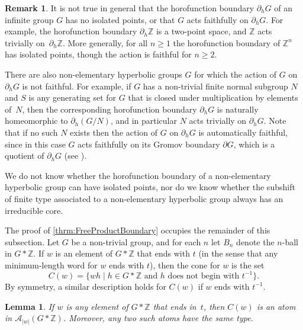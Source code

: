 \documentclass[11pt,letterpaper]{amsart}
\newtheorem{lemma}[theorem]{Lemma}
\theoremstyle{definition}
\newtheorem{remark}[theorem]{Remark}
\newcommand{\Z}{\mathbb{Z}}
\newcommand{\A}{\mathcal{A}}
\begin{document}
\begin{remark}\label{rmk:horofunction_problems}
It is not true in general that the horofunction boundary $\partial_h G$ of an infinite group $G$ has no isolated points, or that $G$ acts faithfully on $\partial_h G$.  For example, the horofunction boundary $\partial_h \Z$ is a two-point space, and $\Z$ acts trivially on~$\partial_h\Z$.  More generally, for all $n\ge 1$ the horofunction boundary of $\Z^n$ has isolated points, though the action is faithful for $n\geq 2$.

There are also non-elementary hyperbolic groups $G$ for which the action of $G$ on $\partial_h G$ is not faithful.  For example, if $G$ has a non-trivial finite normal subgroup $N$ and $S$ is any generating set for $G$ that is closed under multiplication by elements of~$N$, then the corresponding horofunction boundary $\partial_h G$ is naturally homeomorphic to $\partial_h(G/N)$, and in particular $N$ acts trivially on $\partial_h G$.  Note that if no such $N$ exists then the action of $G$ on $\partial_h G$ is automatically faithful, since in this case $G$ acts faithfully on its Gromov boundary $\partial G$, which is a quotient of $\partial_h G$ (see \cite{WeWi}).

We do not know whether the horofunction boundary of a non-elementary hyperbolic group can have isolated points, nor do we know whether the subshift of finite type associated to a non-elementary hyperbolic group always has an irreducible core.
\end{remark}

The proof of \cref{thrm:FreeProductBoundary} occupies the remainder of this subsection.  Let $G$ be a non-trivial group, and for each $n$ let $B_n$ denote the $n$-ball in $G*\Z$. If $w$ is an element of $G*\Z$ that ends with $t$ (in the sense that any minimum-length word for $w$ ends with $t$), then the cone for $w$ is the set
\[
C(w) = \{wh \mid h\in G*\Z\text{ and $h$ does not begin with $t^{-1}$}\}.
\]
By symmetry, a similar description holds for $C(w)$ if $w$ ends with $t^{-1}$.

\begin{lemma}\label{lem:ConesAreAtoms}
If $w$ is any element of $G*\Z$ that ends in~$t$, then $C(w)$ is an atom in $\A_{|w|}(G*\Z)$.  Moreover, any two such atoms have the same type.
\end{lemma}
\end{document}
